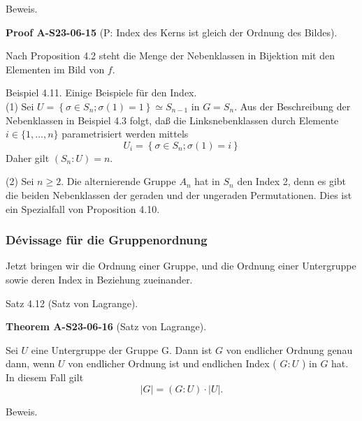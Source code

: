 \documentclass[10pt, letterpaper]{article}
\newcommand{\CustomHeading}[3]{%
  \par\medskip\noindent%
  \textbf{#1 #2} \textnormal{(#3)}.\enskip%
}
\newenvironment{THEO}[2]{\begin{unitbox}\CustomHeading{Theorem}{#1}{#2}}{\end{unitbox}}
\newenvironment{PROOF}[2]{\begin{unitbox}\CustomHeading{Proof}{#1}{#2}}{\end{unitbox}}
\begin{document}
Beweis. 


\begin{PROOF}{A-S23-06-15}{P: Index des Kerns ist gleich der Ordnung des Bildes}
Nach Proposition 4.2 steht die Menge der Nebenklassen in Bijektion mit den Elementen im Bild von $f$.
\end{PROOF}



Beispiel 4.11. Einige Beispiele für den Index.\\


(1) Sei $U=\left\{\sigma \in S_{n} ; \sigma(1)=1\right\} \simeq S_{n-1}$ in $G=S_{n}$. Aus der Beschreibung der Nebenklassen in Beispiel 4.3 folgt, daß die Linksnebenklassen durch Elemente $i \in\{1, \ldots, n\}$ parametrisiert werden mittels
$$
U_{i}=\left\{\sigma \in S_{n} ; \sigma(1)=i\right\}
$$
Daher gilt $\left(S_{n}: U\right)=n$.


(2) Sei $n \geq 2$. Die alternierende Gruppe $A_{n}$ hat in $S_{n}$ den Index 2, denn es gibt die beiden Nebenklassen der geraden und der ungeraden Permutationen. Dies ist ein Spezialfall von Proposition 4.10.\\









\subsubsection{Dévissage für die Gruppenordnung} 

Jetzt bringen wir die Ordnung einer Gruppe, und die Ordnung einer Untergruppe sowie deren Index in Beziehung zueinander.

Satz 4.12 (Satz von Lagrange). 


\begin{THEO}{A-S23-06-16}{Satz von Lagrange}
Sei $U$ eine Untergruppe der Gruppe G. Dann ist $G$ von endlicher Ordnung genau dann, wenn $U$ von endlicher Ordnung ist und endlichen Index ( $G: U$ ) in $G$ hat. In diesem Fall gilt
$$
|G|=(G: U) \cdot|U| .
$$
\end{THEO}



Beweis. 
\end{document}
